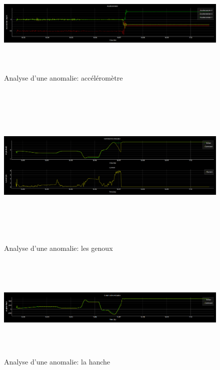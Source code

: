 \begin{figure}[h]
	\centering\includegraphics[height=5cm,width=15cm]{images/analyse_1.png}
	\caption{Analyse d'une anomalie: accéléromètre}
	\label{fig:analyse d'une anomalie: accéléromètre}
\end{figure}

\begin{figure}[h]
	\centering\includegraphics[height=8cm,width=15cm]{images/analyse_2.png}
	\caption{Analyse d'une anomalie: les genoux}
	\label{fig:analyse d'une anomalie: kneePitch}
\end{figure}

\begin{figure}[h]
	\centering\includegraphics[height=5cm,width=15cm]{images/analyse_3.png}
	\caption{Analyse d'une anomalie: la hanche}
	\label{fig:analyse d'une anomalie: hipitch}
\end{figure}

